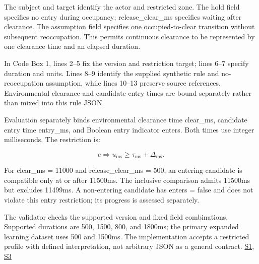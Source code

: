 \documentclass[nolineno]{ieeeaccess}
\begin{document}
The {\ttfamily{}\selectfont\footnotesize subject} and {\ttfamily{}\selectfont\footnotesize target} identify the actor and restricted zone. The {\ttfamily{}\selectfont\footnotesize hold} field specifies no entry during occupancy; {\ttfamily{}\selectfont\footnotesize release\_\allowbreak clear\_\allowbreak ms} specifies waiting after clearance. The {\ttfamily{}\selectfont\footnotesize assumption} field specifies one occupied-to-clear transition without subsequent reoccupation. This permits continuous clearance to be represented by one clearance time and an elapsed duration.\par

In Code Box 1, lines 2--5 fix the version and restriction target; lines 6--7 specify duration and units. Lines 8--9 identify the supplied synthetic rule and no-reoccupation assumption, while lines 10--13 preserve source references. Environmental clearance and candidate entry times are bound separately rather than mixed into this rule JSON.\par

Evaluation separately binds environmental clearance time {\ttfamily{}\selectfont\footnotesize clear\_\allowbreak ms}, candidate entry time {\ttfamily{}\selectfont\footnotesize entry\_\allowbreak ms}, and Boolean entry indicator {\ttfamily{}\selectfont\footnotesize enters}. Both times use integer milliseconds. The restriction is:\par

\[e\Rightarrow u_{\mathrm{ms}}\geq\tau_{\mathrm{ms}}+\Delta_{\mathrm{ms}}.\]

For {\ttfamily{}\selectfont\footnotesize clear\_\allowbreak ms = 11000} and {\ttfamily{}\selectfont\footnotesize release\_\allowbreak clear\_\allowbreak ms = 500}, an entering candidate is compatible only at or after 11500ms. The inclusive comparison admits 11500ms but excludes 11499ms. A non-entering candidate has {\ttfamily{}\selectfont\footnotesize enters = false} and does not violate this entry restriction; its progress is assessed separately.\par

The validator checks the supported version and fixed field combinations. Supported durations are 500, 1500, 800, and 1800ms; the primary expanded learning dataset uses 500 and 1500ms. The implementation accepts a restricted profile with defined interpretation, not arbitrary JSON as a general contract. \href{\detokenize{projects/04-guardsynth-coc/experiments/paper1_cnl_learning/temporal_preservation.py}}{S1}, \href{\detokenize{projects/04-guardsynth-coc/experiments/paper1_cnl_learning/temporal_training_data.py}}{S3}\par
\end{document}
